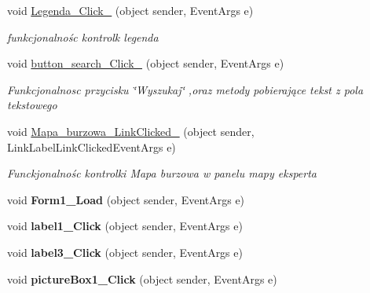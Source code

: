 \begin{DoxyCompactItemize}
void \mbox{\hyperlink{class_pogodynka__w57003_1_1panel__glony_ae9fe7cb3a32f5d4c437ab29212d6ea42}{Legenda\+\_\+\+Click\+\_}} (object sender, Event\+Args e)
\begin{DoxyCompactList}\small\item\em funkcjonalnośc kontrolk legenda \end{DoxyCompactList}\item 
void \mbox{\hyperlink{class_pogodynka__w57003_1_1panel__glony_a0ecf75f825f5031f164a81ea0e61de1c}{button\+\_\+search\+\_\+\+Click\+\_}} (object sender, Event\+Args e)
\begin{DoxyCompactList}\small\item\em Funkcjonalnosc przycisku \char`\"{}\+Wyszukaj\char`\"{} ,oraz metody pobierające tekst z pola tekstowego \end{DoxyCompactList}\item 
void \mbox{\hyperlink{class_pogodynka__w57003_1_1panel__glony_af5137f1d9cbd6b2de8018a922c8eb87b}{Mapa\+\_\+burzowa\+\_\+\+Link\+Clicked\+\_}} (object sender, Link\+Label\+Link\+Clicked\+Event\+Args e)
\begin{DoxyCompactList}\small\item\em Funckjonalnośc kontrolki Mapa burzowa w panelu mapy eksperta \end{DoxyCompactList}\item 
\mbox{\label{class_pogodynka__w57003_1_1panel__glony_a51f8b1e9e647f9e3c549383b28d3c545}} 
void {\bfseries Form1\+\_\+\+Load} (object sender, Event\+Args e)
\item 
\mbox{\label{class_pogodynka__w57003_1_1panel__glony_a6167e1624375f77ff4533b1e7f961edc}} 
void {\bfseries label1\+\_\+\+Click} (object sender, Event\+Args e)
\item 
\mbox{\label{class_pogodynka__w57003_1_1panel__glony_afc8dc7c22b9481f62a650f08e5798fed}} 
void {\bfseries label3\+\_\+\+Click} (object sender, Event\+Args e)
\item 
\mbox{\label{class_pogodynka__w57003_1_1panel__glony_a6c721469331c8eaf0d4a7de4d8f7acfe}} 
void {\bfseries picture\+Box1\+\_\+\+Click} (object sender, Event\+Args e)
\item 
\mbox{\label{class_pogodynka__w57003_1_1panel__glony_a5b28280fad60a92dd50f8afd7fdf090d}} 

\end{DoxyCompactItemize}
